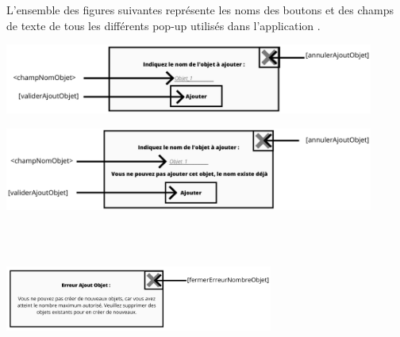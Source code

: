 L'ensemble des figures suivantes représente les noms des boutons et des champs de texte de tous les différents pop-up utilisés dans l'application {\nomApplication}. \\
\medskip

\begin{minipage}{1\linewidth}
    \centering
    \includegraphics[width=0.91\textwidth]{sections/3_Exigences_specifiques/1_IHM/ihm/popUpObjet.png}
    \vspace{-0.3cm}
    \newline
    \label{ecran_ajout_objet}
\end{minipage} \newline
\vspace{1cm}

\begin{minipage}{1\linewidth}
    \centering
    \includegraphics[width=0.91\textwidth]{sections/3_Exigences_specifiques/1_IHM/ihm/popupErreurSaisieObjet.png}
    \vspace{-0.3cm}
    \newline
    \label{ecran_erreur_ajout_objet}
\end{minipage} \\ \\

\begin{minipage}{1.3\linewidth}
    \centering
    \includegraphics[width=0.66\textwidth]{sections/3_Exigences_specifiques/1_IHM/ihm/popUpErreurAjoutObjet.png}
    \label{ecran_erreur_ajout_nombre_objet}
\end{minipage}\\ \\

